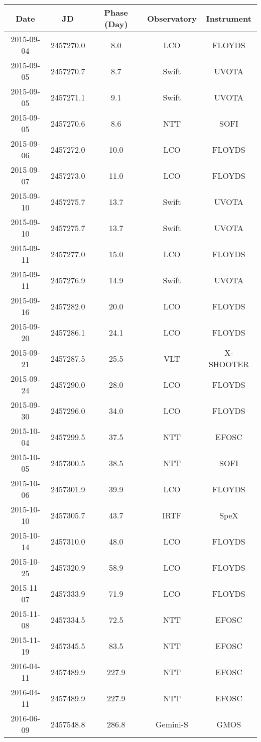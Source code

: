 \begin{table*}
\caption{Spectroscopic Observations of ASASSN-15oz.\label{tab:SpecObs}}
\begin{tabular}{ccccc}
\hline
Date & JD & Phase (Day) & Observatory & Instrument \\
\hline
2015-09-04 & 2457270.0 & 8.0 & LCO & FLOYDS \\
2015-09-05 & 2457270.7 & 8.7 & Swift & UVOTA \\
2015-09-05 & 2457271.1 & 9.1 & Swift & UVOTA \\
2015-09-05 & 2457270.6 & 8.6 & NTT & SOFI \\
2015-09-06 & 2457272.0 & 10.0 & LCO & FLOYDS \\
2015-09-07 & 2457273.0 & 11.0 & LCO & FLOYDS \\
2015-09-10 & 2457275.7 & 13.7 & Swift & UVOTA \\
2015-09-10 & 2457275.7 & 13.7 & Swift & UVOTA \\
2015-09-11 & 2457277.0 & 15.0 & LCO & FLOYDS \\
2015-09-11 & 2457276.9 & 14.9 & Swift & UVOTA \\
2015-09-16 & 2457282.0 & 20.0 & LCO & FLOYDS \\
2015-09-20 & 2457286.1 & 24.1 & LCO & FLOYDS \\
2015-09-21 & 2457287.5 & 25.5 & VLT & X-SHOOTER \\
2015-09-24 & 2457290.0 & 28.0 & LCO & FLOYDS \\
2015-09-30 & 2457296.0 & 34.0 & LCO & FLOYDS \\
2015-10-04 & 2457299.5 & 37.5 & NTT & EFOSC \\
2015-10-05 & 2457300.5 & 38.5 & NTT & SOFI \\
2015-10-06 & 2457301.9 & 39.9 & LCO & FLOYDS \\
2015-10-10 & 2457305.7 & 43.7 & IRTF & SpeX \\
2015-10-14 & 2457310.0 & 48.0 & LCO & FLOYDS \\
2015-10-25 & 2457320.9 & 58.9 & LCO & FLOYDS \\
2015-11-07 & 2457333.9 & 71.9 & LCO & FLOYDS \\
2015-11-08 & 2457334.5 & 72.5 & NTT & EFOSC \\
2015-11-19 & 2457345.5 & 83.5 & NTT & EFOSC \\
2016-04-11 & 2457489.9 & 227.9 & NTT & EFOSC \\
2016-04-11 & 2457489.9 & 227.9 & NTT & EFOSC \\
2016-06-09 & 2457548.8 & 286.8 & Gemini-S & GMOS \\

\end{tabular}
\end{table*}
